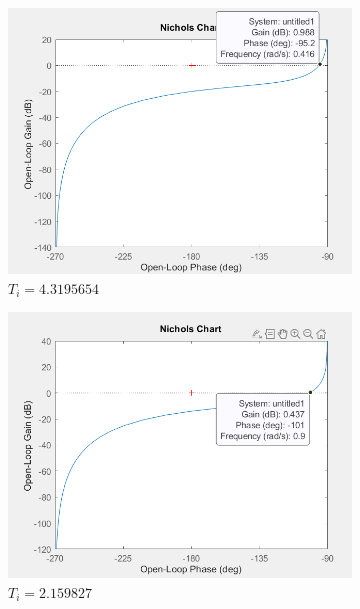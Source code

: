 \documentclass[12pt, a4paper]{report}
\begin{document}
\begin{figure}[H]
    \begin{subfigure}[h!]{0.4\linewidth}
        \includegraphics[width=\linewidth]{sim2ti1diag.png}
        \caption{$T_i = 4.3195654$}
    \end{subfigure}
    \hfill    
    \begin{subfigure}[h!]{0.4\linewidth}
        \includegraphics[width=\linewidth]{sim2ti2diag.png}
        \caption{$T_i = 2.159827$}
    \end{subfigure}    
    \hfill    
    \begin{subfigure}[h!]{0.4\linewidth}

\end{subfigure}
\end{figure}
\end{document}
